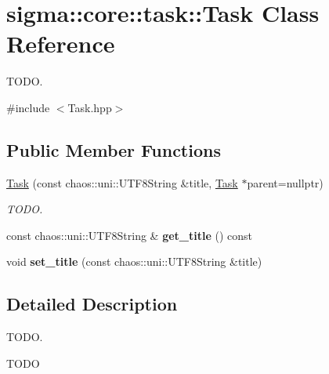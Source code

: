 \hypertarget{classsigma_1_1core_1_1task_1_1_task}{\section{sigma\-:\-:core\-:\-:task\-:\-:Task Class Reference}
\label{classsigma_1_1core_1_1task_1_1_task}
}


T\-O\-D\-O.  




{\ttfamily \#include $<$Task.\-hpp$>$}

\subsection*{Public Member Functions}
\begin{DoxyCompactItemize}
\item 
\hyperlink{classsigma_1_1core_1_1task_1_1_task_af7fccb66c3cdf01deafd0f024ee40726}{Task} (const chaos\-::uni\-::\-U\-T\-F8\-String \&title, \hyperlink{classsigma_1_1core_1_1task_1_1_task}{Task} $\ast$parent=nullptr)
\begin{DoxyCompactList}\small\item\em T\-O\-D\-O. \end{DoxyCompactList}\item 
\hypertarget{classsigma_1_1core_1_1task_1_1_task_a9796b0e5d83f0622fdb5dbf84c39de80}{const chaos\-::uni\-::\-U\-T\-F8\-String \& {\bfseries get\-\_\-title} () const }\label{classsigma_1_1core_1_1task_1_1_task_a9796b0e5d83f0622fdb5dbf84c39de80}

\item 
\hypertarget{classsigma_1_1core_1_1task_1_1_task_a9f3daeb27fdd7f04e7b71405f9fa16d3}{void {\bfseries set\-\_\-title} (const chaos\-::uni\-::\-U\-T\-F8\-String \&title)}\label{classsigma_1_1core_1_1task_1_1_task_a9f3daeb27fdd7f04e7b71405f9fa16d3}

\end{DoxyCompactItemize}


\subsection{Detailed Description}
T\-O\-D\-O. 

T\-O\-D\-O 

